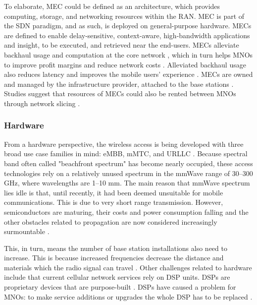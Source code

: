 \documentclass[12pt]{article}
\begin{document}
To elaborate, \gls{MEC} could be defined as an architecture, which provides computing, storage, and networking resources within the \gls{RAN}. \gls{MEC} is part of the \gls{SDN} paradigm, and as such, is deployed on general-purpose hardware. \glspl{MEC} are defined to enable delay-sensitive, context-aware, high-bandwidth applications and insight, to be executed, and retrieved near the end-users. \glspl{MEC} alleviate backhaul usage and computation at the core network \cite{tran2017collaborative, blanco2017technology}, which in turn helps \glspl{MNO} to improve profit margins and reduce network costs \cite{saguna-intel2016}. Alleviated backhaul usage also reduces latency and improves the mobile users' experience \cite{tran2017collaborative}. \glspl{MEC} are owned and managed by the infrastructure provider, attached to the base stations \cite{blanco2017technology}. Studies suggest that resources of \glspl{MEC} could also be rented between \glspl{MNO} through network slicing \cite{samdanis2016network}.

\subsubsection{Hardware}

From a hardware perspective, the wireless access is being developed with three broad use case families in mind: \gls{eMBB}, \gls{mMTC}, and \gls{URLLC} \cite{tullberg2016metis}. Because spectral band often called "beachfront spectrum" has become nearly occupied, these access technologies rely on a relatively unused spectrum in the \gls{mmWave} range of 30–300 GHz, where wavelengths are 1–10 mm. The main reason that \gls{mmWave} spectrum lies idle is that, until recently, it had been deemed unsuitable for mobile communications. This is due to very short range transmission. However, semiconductors are maturing, their costs and power consumption falling and the other obstacles related to propagation are now considered increasingly surmountable \cite{andrews2014will}.

This, in turn, means the number of base station installations also need to increase. This is because increased frequencies decrease the distance and materials which the radio signal can travel \cite{parvez2018survey}. Other challenges related to hardware include that current cellular network services rely on \gls{DSP} units. \glspl{DSP} are proprietary devices that are purpose-built  \cite{sherry2012making, wang2011untold}. \glspl{DSP} have caused a problem for \glspl{MNO}: to make service additions or upgrades the whole \gls{DSP} has to be replaced \cite{li2015software}.
\end{document}
